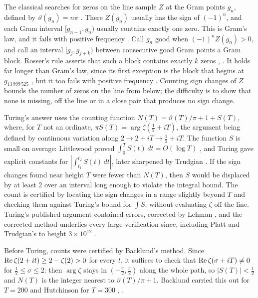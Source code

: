 The classical searches for zeros on the line sample $Z$ at the Gram points $g_n$, defined by $\vartheta(g_n)=n\pi$ \cite[pp.~301 and 302]{Gram03}. There $Z(g_n)$ usually has the sign of $(-1)^n$, and each Gram interval $[g_{n-1},g_n)$ usually contains exactly one zero. This is Gram's law, and it fails with positive frequency \cite[Corollary 5.4]{Trudgian11b}. Call $g_n$ good when $(-1)^nZ(g_n)>0$, and call an interval $[g_j,g_{j+k})$ between consecutive good Gram points a Gram block. Rosser's rule asserts that such a block contains exactly $k$ zeros \cite{RYS69}, \cite[Section 7.3]{Trudgian11b}. It holds far longer than Gram's law, since its first exception is the block that begins at $g_{13\,999\,525}$ \cite[Table 3]{Brent79}, but it too fails with positive frequency \cite[Corollary 7.8]{Trudgian11b}. Counting sign changes of $Z$ bounds the number of zeros on the line from below; the difficulty is to show that none is missing, off the line or in a close pair that produces no sign change.

Turing's answer \cite{Turing53} uses the counting function $N(T)=\vartheta(T)/\pi+1+S(T)$, where, for $T$ not an ordinate, $\pi S(T)=\arg\zeta(\frac12+iT)$, the argument being defined by continuous variation along $2\to2+iT\to\frac12+iT$. The function $S$ is small on average: Littlewood proved $\int_0^TS(t)\,dt=O(\log T)$ \cite[Theorem 9.9(A)]{Titchmarsh}, and Turing gave explicit constants for $|\int_{t_1}^{t_2}S(t)\,dt|$, later sharpened by Trudgian \cite{Trudgian11}. If the sign changes found near height $T$ were fewer than $N(T)$, then $S$ would be displaced by at least $2$ over an interval long enough to violate the integral bound. The count is certified by locating the sign changes in a range slightly beyond $T$ and checking them against Turing's bound for $\int S$, without evaluating $\zeta$ off the line. Turing's published argument contained errors, corrected by Lehman \cite{Lehman70}, and the corrected method underlies every large verification since, including Platt and Trudgian's to height $3\times10^{12}$ \cite{PT21}.

Before Turing, counts were certified by Backlund's method. Since $\operatorname{Re}\zeta(2+it)\ge2-\zeta(2)>0$ for every $t$, it suffices to check that $\operatorname{Re}\zeta(\sigma+iT)\ne0$ for $\frac12\le\sigma\le2$: then $\arg\zeta$ stays in $(-\frac\pi2,\frac\pi2)$ along the whole path, so $|S(T)|<\frac12$ and $N(T)$ is the integer nearest to $\vartheta(T)/\pi+1$. Backlund carried this out for $T=200$ \cite{Backlund} and Hutchinson for $T=300$ \cite[pp.~54 to 57]{Hutchinson25}, \cite{Trudgian11}.

